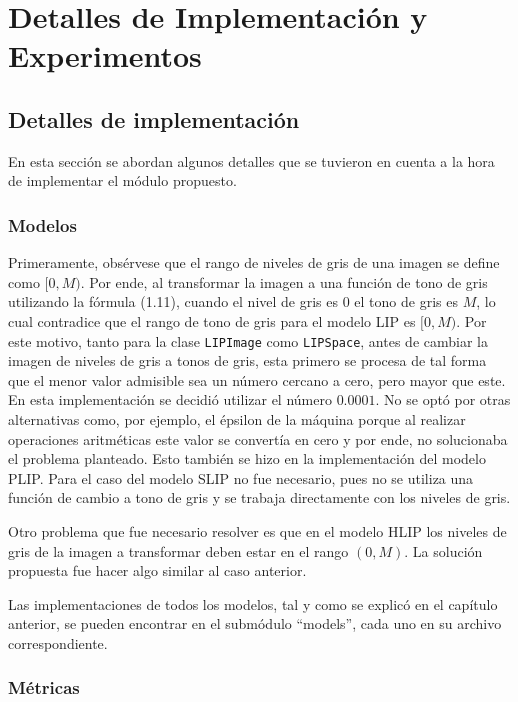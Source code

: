 \chapter{Detalles de Implementación y Experimentos}\label{chapter:implementation}

\section{Detalles de implementaci\'on}

En esta secci\'on se abordan algunos detalles que se tuvieron en cuenta a la hora de implementar el m\'odulo propuesto.

\subsection{Modelos}

Primeramente, obs\'ervese que el rango de niveles de gris de una imagen se define como $[0,M)$. Por ende, al transformar la imagen a una funci\'on de tono de gris utilizando la f\'ormula (1.11), cuando el nivel de gris es 0 el tono de gris es $M$, lo cual contradice que el rango de tono de gris para el modelo LIP es $[0,M)$. Por este motivo, tanto para la clase \verb|LIPImage| como \verb|LIPSpace|, antes de cambiar la imagen de niveles de gris a tonos de gris, esta primero se procesa de tal forma que el menor valor admisible sea un n\'umero cercano a cero, pero mayor que este. En esta implementaci\'on se decidi\'o utilizar el n\'umero $0.0001$. No se opt\'o por otras alternativas como, por ejemplo, el \'epsilon de la m\'aquina porque al realizar operaciones aritm\'eticas este valor se convert\'ia en cero y por ende, no solucionaba el problema planteado. Esto tambi\'en se hizo en la implementaci\'on del modelo PLIP. Para el caso del modelo SLIP no fue necesario, pues no se utiliza una funci\'on de cambio a tono de gris y se trabaja directamente con los niveles de gris.

Otro problema que fue necesario resolver es que en el modelo HLIP los niveles de gris de la imagen a transformar deben estar en el rango $(0,M)$. La soluci\'on propuesta fue hacer algo similar al caso anterior.

Las implementaciones de todos los modelos, tal y como se explic\'o en el cap\'itulo anterior, se pueden encontrar en el subm\'odulo ``models'', cada uno en su archivo correspondiente.

\subsection{M\'etricas}

